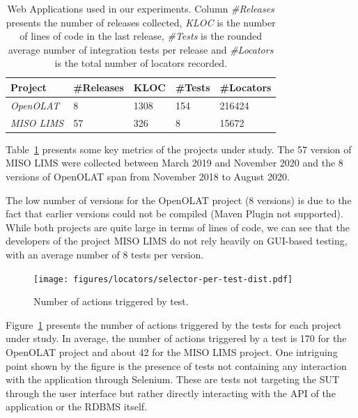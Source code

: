\begin{table}
\caption{Web Applications used in our experiments. Column \emph{\#Releases} presents the number of releases collected, \emph{KLOC} is the number of lines of code in the last release, \emph{\#Tests} is the rounded average number of integration tests per release and \emph{\#Locators} is the total number of locators recorded.}
\label{tab:hpath-protocol-projects}
\begin{center}
\begin{tabular}{>{\raggedright}m{0.4in}>{\raggedleft}m{0.4in}>{\raggedleft}m{0.4in}>{\raggedleft}m{0.4in}>{\raggedleft}m{0.4in}}
\toprule
\textbf{\scriptsize{Project}} & \textbf{\scriptsize{\#Releases}} & \textbf{\scriptsize{KLOC}} & \textbf{\scriptsize{\#Tests}} & \textbf{\scriptsize{\#Locators}} \tabularnewline
\toprule
\scriptsize{\textit{OpenOLAT}} & \scriptsize{8} & \scriptsize{1308} & \scriptsize{154} & \scriptsize{216424} \tabularnewline
\scriptsize{\textit{MISO LIMS}} & \scriptsize{57} & \scriptsize{326} & \scriptsize{8} & \scriptsize{15672} \tabularnewline
\bottomrule
\end{tabular}
\end{center}
\end{table}

Table~\ref{tab:hpath-protocol-projects} presents some key metrics of the projects under study. The 57 version of MISO LIMS were collected between March 2019 and November 2020 and the 8 versions of OpenOLAT span from November 2018 to August 2020. 

The low number of versions for the OpenOLAT project (8 versions) is due to the fact that earlier versions could not be compiled (Maven Plugin not supported). While both projects are quite large in terms of lines of code, we can see that the developers of the project MISO LIMS do not rely heavily on GUI-based testing, with an average number of 8 tests per version.

\begin{figure}
\centering
\texttt{[image: figures/locators/selector-per-test-dist.pdf]}
\caption{Number of actions triggered by test.}  
\label{fig:hpath-protocol-actions}
\end{figure}

Figure~\ref{fig:hpath-protocol-actions} presents the number of actions triggered by the tests for each project under study. In average, the number of actions triggered by a test is 170 for the OpenOLAT project and about 42 for the MISO LIMS project. One intriguing point shown by the figure is the presence of tests not containing any interaction with the application through Selenium. These are tests not targeting the SUT through the user interface but rather directly interacting with the API of the application or the RDBMS itself.

